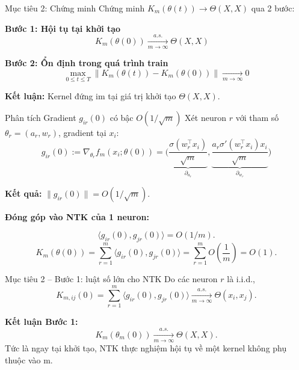 \begin{frame}{Mục tiêu 2: Chứng minh}
  Chứng minh $K_m(\theta(t)) \to \Theta(X,X)$ qua 2 bước:

  \vspace{0.3cm}
  \textbf{Bước 1: Hội tụ tại khởi tạo}
  \[
    K_m(\theta(0)) \xrightarrow[m\to\infty]{a.s.} \Theta(X,X) \quad 
  \]

  \vspace{0.3cm}
  \textbf{Bước 2: Ổn định trong quá trình train}
  \[ 
    \max_{0 \le t \le T} \|K_m(\theta(t)) - K_m(\theta(0))\| \xrightarrow[m\to\infty]{} 0
  \]


  \vspace{0.3cm}
  \textbf{Kết luận:} Kernel đứng im tại giá trị khởi tạo $\Theta(X,X)$.
\end{frame}

\begin{frame}{Phân tích Gradient $g_{ir}(0)$ có bậc $O(1/\sqrt{m})$}
  Xét neuron $r$ với tham số $\theta_r = (a_r, w_r)$, gradient tại $x_i$:
  \[
    g_{ir}(0) := \nabla_{\theta_r} f_m(x_i; \theta(0)) = 
    \Big( \underbrace{\frac{\sigma(w_r^\top x_i)}{\sqrt{m}}}_{\partial_{a_r}}, \underbrace{\frac{a_r \sigma'(w_r^\top x_i)x_i}{\sqrt{m}}}_{\partial_{w_r}} \Big)
  \]
  
  \textbf{Kết quả:} $\|g_{ir}(0)\| = O(1/\sqrt{m})$. 

  \vspace{0.3cm}
  \textbf{Đóng góp vào NTK của 1 neuron:}
    
  \[
    \langle g_{ir}(0), g_{jr}(0) \rangle = O(1/m).
   \] 
   \[
    K_m(\theta(0)) = \sum_{r=1}^m \langle g_{ir}(0), g_{jr}(0) \rangle = \sum_{r=1}^m O\left(\frac{1}{m}\right) = O(1).
  \]
\end{frame}


\begin{frame}{Mục tiêu 2 – Bước 1: luật số lớn cho NTK}
  Do các neuron $r$ là i.i.d.,
  \[
    K_{m,ij}(0)
    = \sum_{r=1}^m \big\langle g_{ir}(0),g_{jr}(0)\big\rangle
    \xrightarrow[m\to\infty]{a.s.} \Theta(x_i,x_j).
  \]

  \textbf{Kết luận Bước 1:}
  \[
    K_m(\theta_m(0)) \xrightarrow[m\to\infty]{a.s.} \Theta(X,X).
  \]
  Tức là ngay tại khởi tạo, NTK thực nghiệm hội tụ về một kernel không phụ thuộc vào m.
\end{frame}

